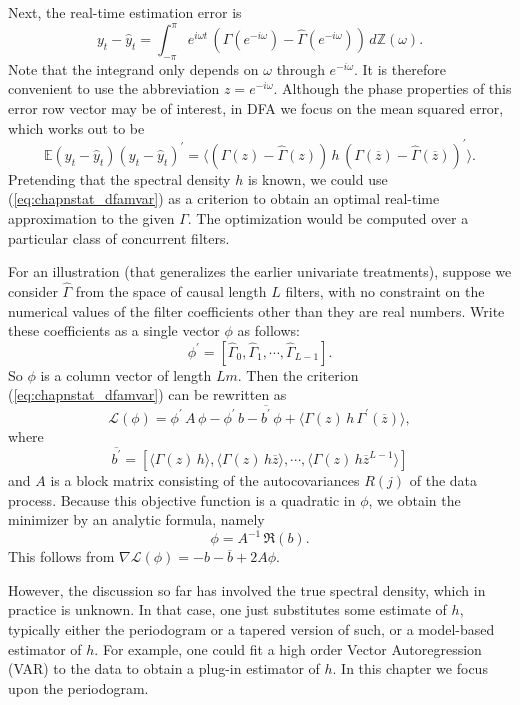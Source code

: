 \documentclass[a4paper]{book}
\def\ZZ{\mathbb Z}
\def\EE{\mathbb E}
\begin{document}
Next, the real-time estimation error is 
\[
  y_t  - \widehat{y}_t = \int_{-\pi}^{\pi} e^{i \omega t} \, \left( \Gamma (e^{-i \omega}) -  \widehat{\Gamma} (e^{-i \omega}) \right) \, d\ZZ (\omega).
\]
  Note that the integrand only depends on $\omega$ through $e^{-i \omega}$.  It is therefore convenient to use the abbreviation $z = e^{-i \omega}$.
  Although the phase properties of this error row vector may be of interest, in DFA we focus on the mean squared error, which works out to be
\begin{equation}
 \label{eq:chapnstat_dfamvar}
 \EE (y_t  - \widehat{y}_t) {(y_t  - \widehat{y}_t)}^{\prime} = \langle  \left( \Gamma (z) -  \widehat{\Gamma} (z) \right) \, h \,
  {  \left( \Gamma (\overline{z}) -  \widehat{\Gamma} (\overline{z}) \right) }^{\prime} \rangle.
\end{equation}
  Pretending that the spectral density $h$ is known, we could use (\ref{eq:chapnstat_dfamvar}) as a criterion to obtain an optimal real-time
approximation to the given $\Gamma$.  The optimization would be computed over a particular class of concurrent filters.  

For an illustration (that generalizes the earlier univariate treatments), suppose we consider $\widehat{\Gamma}$ from the space of causal length $L$ filters, with no constraint on the numerical values of
the filter coefficients other than they are real numbers.  Write these coefficients as a single vector $\phi$ as follows:
\[
  \phi^{\prime} = [ \widehat{\Gamma}_0, \widehat{\Gamma}_1, \cdots, \widehat{\Gamma}_{L-1} ].
\]
 So $\phi$ is a column vector of length $Lm$.  Then the criterion (\ref{eq:chapnstat_dfamvar}) can be rewritten as
\[
 \mathcal{L} (\phi) = \phi^{\prime} \, A \, \phi - \phi^{\prime} \, b - \overline{b^{\prime}} \, \phi + \langle \Gamma (z) \, h \, \Gamma^{\prime} (\overline{z}) \rangle,
\]
 where 
\[
  \overline{b^{\prime}}  = [ \langle \Gamma (z) \, h \rangle, \langle \Gamma (z) \, h \overline{z} \rangle, \cdots, \langle \Gamma (z) \, h \overline{z}^{L-1} \rangle ] 
\]
 and $A$ is a block matrix consisting of the autocovariances $R (j)$ of the data process.  Because this objective function is a quadratic in $\phi$, we obtain the minimizer
by an analytic formula, namely
\[
 \phi = A^{-1} \, \Re (b).
\]
  This follows from $\nabla \mathcal{L} (\phi) = -b - \overline{b} + 2 A \phi$.  

However, the discussion so far has involved the true spectral density, which in practice is unknown.  In that case, one just substitutes some estimate of $h$, typically
 either the periodogram or a tapered version of such, or a model-based estimator of $h$.  For example, one could fit a high order Vector Autoregression (VAR) to the data to 
obtain a plug-in estimator of $h$.  In this chapter we focus upon the periodogram.
\end{document}
